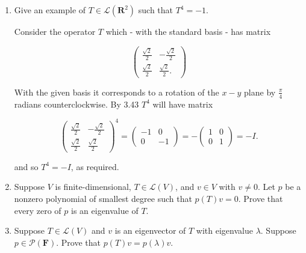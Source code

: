 \documentclass{book}
\begin{document}
\begin{enumerate}
\item Give an example of \(T \in \mathcal{L}(\textbf{R}^2)\) such that \(T^4=-1\).

Consider the operator \(T\) which - with the standard basis - has matrix

\begin{equation*}
    \begin{pmatrix}
        \frac{\sqrt{2}}{2} & -\frac{\sqrt{2}}{2} \\
        \frac{\sqrt{2}}{2} & \frac{\sqrt{2}}{2}.
    \end{pmatrix}
\end{equation*}

With the given basis it corresponds to a rotation of the \(x-y\) plane by \(\frac{\pi}{4}\) radians counterclockwise.  By 3.43 \(T^4\) will have matrix

\begin{equation*}
    \begin{pmatrix}
        \frac{\sqrt{2}}{2} & -\frac{\sqrt{2}}{2} \\
        \frac{\sqrt{2}}{2} & \frac{\sqrt{2}}{2}
    \end{pmatrix}^4
    =
    \begin{pmatrix}
        -1 & 0 \\
        0 & -1
    \end{pmatrix}
    =-
    \begin{pmatrix}
        1 & 0 \\
        0 & 1
    \end{pmatrix}
    =-I.
\end{equation*}

and so \(T^4=-I\), as required.

\item Suppose \(V\) is finite-dimensional, \(T \in \mathcal{L}(V)\), and \(v \in V\) with \(v \neq 0\).  Let \(p\) be a nonzero polynomial of smallest degree such that \(p(T)v=0\).  Prove that every zero of \(p\) is an eigenvalue of \(T\).


\item Suppose \(T \in \mathcal{L}(V)\) and \(v\) is an eigenvector of \(T\) with eigenvalue \(\lambda\).  Suppose \(p \in \mathcal{P}(\textbf{F})\).  Prove that \(p(T)v=p(\lambda)v\).


\end{enumerate}
\end{document}
